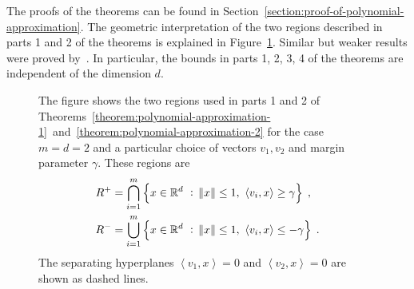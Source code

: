 \documentclass[12pt]{article}
\newcommand{\R}{\mathbb{R}}  %
\newcommand{\ip}[2]{\left\langle #1, #2 \right\rangle} %
\begin{document}
The proofs of the theorems can be found in
Section~\ref{section:proof-of-polynomial-approximation}. The geometric
interpretation of the two regions described in parts 1 and 2 of the theorems is
explained in Figure~\ref{figure:pizza-slice}. Similar but weaker results were
proved by~\cite{Klivans-Servedio-2008}. In particular, the bounds in parts
1, 2, 3, 4 of the theorems are independent of the dimension $d$.

\begin{figure}
\begin{center}

\end{center}
\caption[]{The figure shows the two regions used in parts 1 and 2 of
Theorems~\ref{theorem:polynomial-approximation-1}~and~\ref{theorem:polynomial-approximation-2}
for the case $m=d=2$ and a particular choice of vectors $v_1, v_2$ and margin
parameter $\gamma$. These regions are
\begin{align*}
R^+ & = \displaystyle \bigcap_{i=1}^m \left\{ x \in \R^d ~:~ \norm{x} \le 1, \ \ip{v_i}{x} \ge \gamma \right\} \; , \\
R^- & = \displaystyle \bigcup_{i=1}^m \left\{ x \in \R^d ~:~ \norm{x} \le 1, \ \ip{v_i}{x} \le - \gamma \right\} \; .
\end{align*}
The separating hyperplanes $\ip{v_1}{x} = 0$ and $\ip{v_2}{x} = 0$ are shown as dashed lines.
}
\label{figure:pizza-slice}
\end{figure}
\end{document}

